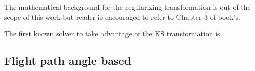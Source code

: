 The mathematical background for the regularizing transformation is out of the
scope of this work but reader is encouraged to refer to Chapter 3 of
\cite{celletti2002} book's.

The first known solver to take advantage of the KS transformation is
\cite{simo1973}




\subsection{Flight path angle based}
